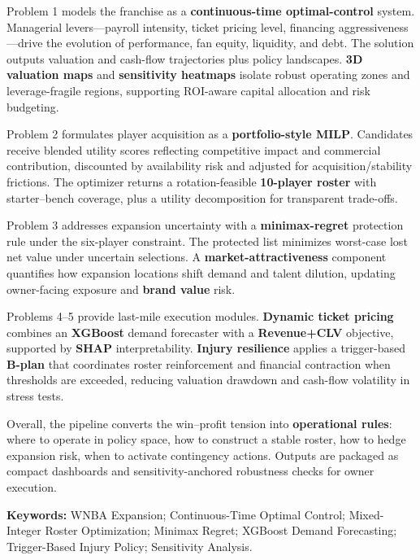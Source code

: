 \documentclass[12pt]{article}
\numberwithin{figure}{section}
\numberwithin{table}{section}
\begin{document}
	Problem 1 models the franchise as a \textbf{continuous-time optimal-control} system. Managerial levers---payroll intensity, ticket pricing level, financing aggressiveness---drive the evolution of performance, fan equity, liquidity, and debt. The solution outputs valuation and cash-flow trajectories plus policy landscapes. \textbf{3D valuation maps} and \textbf{sensitivity heatmaps} isolate robust operating zones and leverage-fragile regions, supporting ROI-aware capital allocation and risk budgeting.
	

	Problem 2 formulates player acquisition as a \textbf{portfolio-style MILP}. Candidates receive blended utility scores reflecting competitive impact and commercial contribution, discounted by availability risk and adjusted for acquisition/stability frictions. The optimizer returns a rotation-feasible \textbf{10-player roster} with starter--bench coverage, plus a utility decomposition for transparent trade-offs.
	

	Problem 3 addresses expansion uncertainty with a \textbf{minimax-regret} protection rule under the six-player constraint. The protected list minimizes worst-case lost net value under uncertain selections. A \textbf{market-attractiveness} component quantifies how expansion locations shift demand and talent dilution, updating owner-facing exposure and \textbf{brand value} risk.
	

	Problems 4--5 provide last-mile execution modules. \textbf{Dynamic ticket pricing} combines an \textbf{XGBoost} demand forecaster with a \textbf{Revenue+CLV} objective, supported by \textbf{SHAP} interpretability. \textbf{Injury resilience} applies a trigger-based \textbf{B-plan} that coordinates roster reinforcement and financial contraction when thresholds are exceeded, reducing valuation drawdown and cash-flow volatility in stress tests.
	

	Overall, the pipeline converts the win--profit tension into \textbf{operational rules}: where to operate in policy space, how to construct a stable roster, how to hedge expansion risk, when to activate contingency actions. Outputs are packaged as compact dashboards and sensitivity-anchored robustness checks for owner execution.

	
	\vspace{0.55em} %
	
	\noindent\textbf{Keywords:} WNBA Expansion; Continuous-Time Optimal Control; Mixed-Integer Roster Optimization; Minimax Regret; XGBoost Demand Forecasting; Trigger-Based Injury Policy; Sensitivity Analysis.
\end{document}
